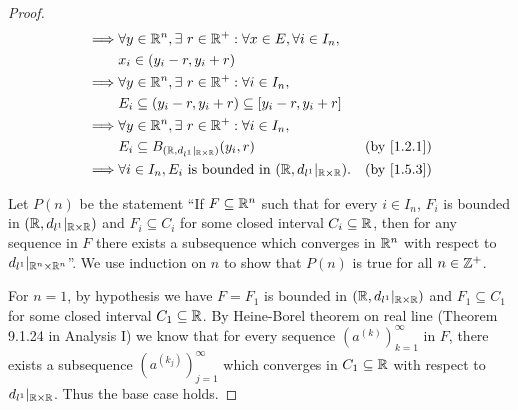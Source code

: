 \begin{proof}
\begin{align*}
    \implies & \forall y \in \R^n, \exists\ r \in \R^+ : \forall x \in E, \forall i \in I_n,                                                             \\
             & x_i \in (y_i - r, y_i + r)                                                                                                                \\
    \implies & \forall y \in \R^n, \exists\ r \in \R^+ : \forall i \in I_n,                                                                              \\
             & E_i \subseteq (y_i - r, y_i + r) \subseteq [y_i - r, y_i + r]                                                                             \\
    \implies & \forall y \in \R^n, \exists\ r \in \R^+ : \forall i \in I_n,                                                                              \\
             & E_i \subseteq B_{(\R, d_{l^1}|_{\R \times \R})}(y_i, r)                                                        & \text{(by \cref{1.2.1})} \\
    \implies & \forall i \in I_n, E_i \text{ is bounded in } (\R, d_{l^1}|_{\R \times \R}).                                   & \text{(by \cref{1.5.3})}
  \end{align*}

  Let \(P(n)\) be the statement ``If \(F \subseteq \mathbb{R}^n\) such that for every \(i \in I_n\), \(F_i\) is bounded in \((\mathbb{R}, d_{l^1}|_{\mathbb{R} \times \mathbb{R}})\) and \(F_i \subseteq C_i\) for some closed interval \(C_i \subseteq \mathbb{R}\), then for any sequence in \(F\) there exists a subsequence which converges in \(\mathbb{R}^n\) with respect to \(d_{l^1}|_{\mathbb{R}^n \times \mathbb{R}^n}\)''.
  We use induction on \(n\) to show that \(P(n)\) is true for all \(n \in \mathbb{Z}^+\).

  For \(n = 1\), by hypothesis we have \(F = F_1\) is bounded in \((\mathbb{R}, d_{l^1}|_{\mathbb{R} \times \mathbb{R}})\) and \(F_1 \subseteq C_1\) for some closed interval \(C_1 \subseteq \mathbb{R}\).
  By Heine-Borel theorem on real line (Theorem 9.1.24 in Analysis I) we know that for every sequence \((a^{(k)})_{k = 1}^\infty\) in \(F\), there exists a subsequence \((a^{(k_j)})_{j = 1}^\infty\) which converges in \(C_1 \subseteq \mathbb{R}\) with respect to \(d_{l^1}|_{\mathbb{R} \times \mathbb{R}}\).
  Thus the base case holds.


\end{proof}
